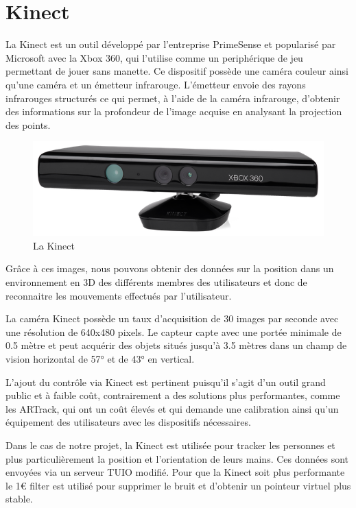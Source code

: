 \newpage

\section{Kinect}

La Kinect est un outil développé par l'entreprise PrimeSense et popularisé par Microsoft avec la Xbox 360, qui l’utilise comme un periphérique de jeu permettant de jouer sans manette. Ce dispositif possède une caméra couleur ainsi qu’une caméra et un émetteur infrarouge. L’émetteur envoie des rayons infrarouges structurés ce qui permet, à l’aide de la caméra infrarouge, d’obtenir des informations sur la profondeur de l’image acquise en analysant la projection des points. 

\begin{figure}[!ht]
	\center	
	\includegraphics[scale=0.5]{image/kinect.png}
	\caption{La Kinect}
\end{figure}

Grâce à ces images, nous pouvons obtenir des données sur la position dans un environnement en 3D des différents membres des utilisateurs et donc de reconnaitre les mouvements effectués par l’utilisateur. 

La caméra Kinect possède un taux d'acquisition de 30 images par seconde avec une résolution de 640x480 pixels. Le capteur capte avec une portée minimale de 0.5 mètre et peut acquérir des objets situés jusqu’à 3.5 mètres dans un champ de vision horizontal de 57° et de 43° en vertical.

L'ajout du contrôle via Kinect est pertinent puisqu'il s'agit d'un outil grand public et à faible coût, contrairement a des solutions plus performantes, comme les ARTrack, qui ont un coût élevés et qui demande une calibration ainsi qu’un équipement des utilisateurs avec les dispositifs nécessaires.

Dans le cas de notre projet, la Kinect est utilisée pour tracker les personnes et plus particulièrement la position et l’orientation de leurs mains. Ces données sont envoyées via un serveur TUIO modifié. Pour que la Kinect soit plus performante le 1€ filter \cite{oneeuro} est utilisé pour supprimer le bruit et d’obtenir un pointeur virtuel plus stable. 



